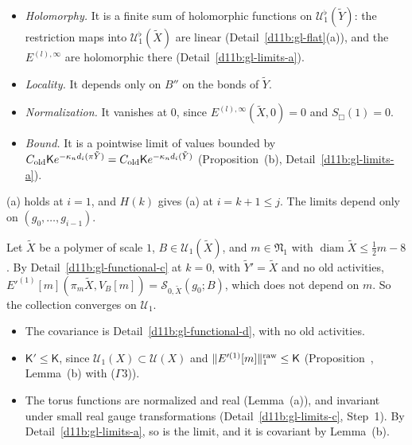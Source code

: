 \begin{step}
\begin{itemize}
\item \emph{Holomorphy.} It is a finite sum of holomorphic functions on $\mathcal U^\flat_1(\tilde Y)$: the restriction maps into $\mathcal U^\flat_1(\tilde X)$ are linear (Detail~\ref{d11b:gl-flat}(a)), and the $E^{(l),\infty}$ are holomorphic there (Detail~\ref{d11b:gl-limits-a}).
\item \emph{Locality.} It depends only on $B''$ on the bonds of $\tilde Y$.
\item \emph{Normalization.} It vanishes at $0$, since $E^{(l),\infty}(\tilde X,0)=0$ and $S_\Box(1)=0$.
\item \emph{Bound.} It is a pointwise limit of values bounded by $C_{\rm old}\mathsf Ke^{-\kappa_nd_i(\pi\tilde Y)}=C_{\rm old}\mathsf Ke^{-\kappa_nd_i(\tilde Y)}$ (Proposition~(b), Detail~\ref{d11b:gl-limits-a}).
\end{itemize}
\end{step}

\begin{detail}[Theorem~\Nref{thm:gen-locality}(a) at $i=1$ and at $i=k+1$]\label{d11b:gen-locality-a}
(a) holds at $i=1$, and $H(k)$ gives (a) at $i=k+1\le j$. The limits depend only on $(g_0,\dots,g_{i-1})$.
\end{detail}

\begin{step}[$i=1$]
Let $\tilde X$ be a polymer of scale $1$, $B\in\mathcal U_1(\tilde X)$, and $m\in\mathfrak N_1$ with $\operatorname{diam}\tilde X\le\frac12m-8$. By Detail~\ref{d11b:gl-functional-c} at $k=0$, with $\tilde Y'=\tilde X$ and no old activities, $E'^{(1)}[m](\pi_m\tilde X,V_B[m])=\mathscr S_{0,\tilde X}(g_0;B)$, which does not depend on $m$. So the collection converges on $\mathcal U_1$.
\begin{itemize}
\item The covariance is Detail~\ref{d11b:gl-functional-d}, with no old activities.
\item $\mathsf K'\le\mathsf K$, since $\mathcal U_1(X)\subset\mathcal U(X)$ and $\|E'^{(1)}[m]\|^{\rm raw}_1\le\mathsf K$ (Proposition~, Lemma~(b) with ($\Gamma$3)).
\item The torus functions are normalized and real (Lemma~(a)), and invariant under small real gauge transformations (Detail~\ref{d11b:gl-limits-c}, Step~1). By Detail~\ref{d11b:gl-limits-a}, so is the limit, and it is covariant by Lemma~(b).
\end{itemize}
\end{step}


